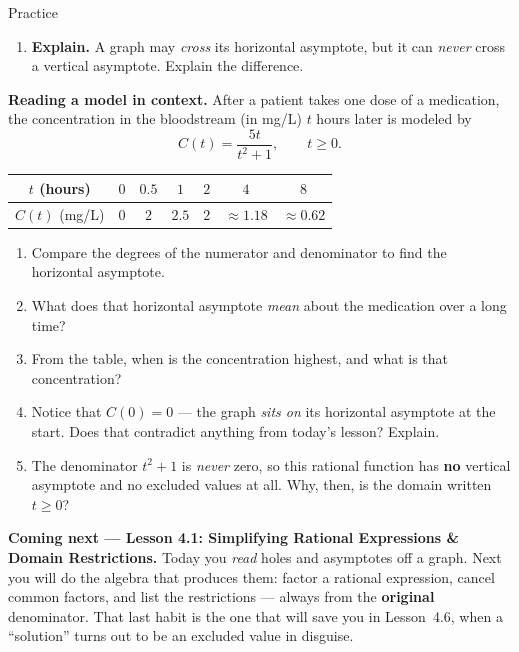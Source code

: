 \documentclass[10pt]{article}
\begin{document}
\begin{notesbox}{Practice}
\begin{enumerate}[leftmargin=1.9em, itemsep=12pt]
  \item \textbf{Explain.} A graph may \emph{cross} its horizontal asymptote, but it can \emph{never}
        cross a vertical asymptote. Explain the difference. 
\end{enumerate}
\end{notesbox}

\begin{extensionbox}
\textbf{Reading a model in context.} After a patient takes one dose of a medication, the concentration
in the bloodstream (in mg/L) $t$ hours later is modeled by
\[
  C(t) = \frac{5t}{t^2+1}, \qquad t \ge 0 .
\]
\begin{center}
\renewcommand{\arraystretch}{1.25}
\begin{tabular}{|c|c|c|c|c|c|c|}
\hline
$t$ (hours) & $0$ & $0.5$ & $1$ & $2$ & $4$ & $8$ \\ \hline
$C(t)$ (mg/L) & $0$ & $2$ & $2.5$ & $2$ & $\approx 1.18$ & $\approx 0.62$ \\ \hline
\end{tabular}
\end{center}
\begin{enumerate}[label=(\alph*), leftmargin=1.8em, itemsep=5pt]
  \item Compare the degrees of the numerator and denominator to find the horizontal asymptote.
  \item What does that horizontal asymptote \emph{mean} about the medication over a long time?
  \item From the table, when is the concentration highest, and what is that concentration?
  \item Notice that $C(0)=0$ --- the graph \emph{sits on} its horizontal asymptote at the start. Does
        that contradict anything from today's lesson? Explain.
  \item The denominator $t^2+1$ is \emph{never} zero, so this rational function has \textbf{no}
        vertical asymptote and no excluded values at all. Why, then, is the domain written $t\ge 0$?
\end{enumerate}
\end{extensionbox}

\begin{spiralbox}
\textbf{Coming next --- Lesson 4.1: Simplifying Rational Expressions \& Domain Restrictions.} Today
you \emph{read} holes and asymptotes off a graph. Next you will do the algebra that produces them:
factor a rational expression, cancel common factors, and list the restrictions --- always from the
\textbf{original} denominator. That last habit is the one that will save you in Lesson~4.6, when a
``solution'' turns out to be an excluded value in disguise.
\end{spiralbox}
\end{document}
